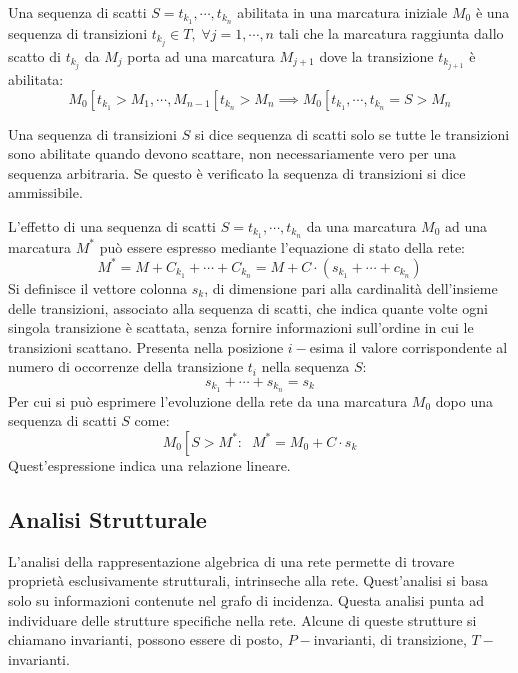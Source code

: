 \documentclass{article}
\numberwithin{equation}{subsection}
\begin{document}
Una sequenza di scatti $S=t_{k_1},\cdots,t_{k_n}$ abilitata in una marcatura iniziale $M_0$ è una sequenza di transizioni $t_{k_j}\in T,\;\forall j=1,\cdots,n$ tali che la 
marcatura raggiunta dallo scatto di $t_{k_j}$ da $M_j$ porta ad una marcatura $M_{j+1}$ dove la transizione $t_{k_{j+1}}$ è abilitata:
\begin{equation*}
    M_0\left[\right.t_{k_1}>M_1,\cdots,M_{n-1}\left[\right.t_{k_n}>M_n\implies M_0\left[\right.t_{k_1},\cdots,t_{k_n}=S>M_n
\end{equation*}

Una sequenza di transizioni $S$ si dice sequenza di scatti solo se tutte le transizioni sono abilitate quando devono scattare, non necessariamente vero per una sequenza 
arbitraria. Se questo è verificato la sequenza di transizioni si dice ammissibile. 

L'effetto di una sequenza di scatti $S=t_{k_1},\cdots,t_{k_n}$ da una marcatura $M_0$ ad una marcatura $M^*$ può essere espresso mediante l'equazione di stato della rete:
\begin{equation*}
    M^*=M+C_{k_1}+\cdots+C_{k_n}=M+C\cdot(s_{k_1}+\cdots+c_{k_n})
\end{equation*}
Si definisce il vettore colonna $s_k$, di dimensione pari alla cardinalità dell'insieme delle transizioni, associato alla sequenza di scatti, che indica quante volte ogni 
singola transizione è scattata, senza fornire informazioni sull'ordine in cui le transizioni scattano. Presenta nella posizione $i-$esima il valore corrispondente al numero 
di occorrenze della transizione $t_i$ nella sequenza $S$:
\begin{equation*}
    s_{k_1}+\cdots+s_{k_n}=s_k
\end{equation*}
Per cui si può esprimere l'evoluzione della rete da una marcatura $M_0$ dopo una sequenza di scatti $S$ come:
\begin{equation*}
    M_0\left[\right.S>M^*:\;\;M^*=M_0+C\cdot s_k
\end{equation*}
Quest'espressione indica una relazione lineare. 

\subsection{Analisi Strutturale}

L'analisi della rappresentazione algebrica di una rete permette di trovare proprietà esclusivamente strutturali, intrinseche alla rete. Quest'analisi si basa solo su 
informazioni contenute nel grafo di incidenza. Questa analisi punta ad individuare delle strutture specifiche nella rete. Alcune di queste strutture si chiamano invarianti, 
possono essere di posto, $P-$invarianti, di transizione, $T-$invarianti. 
\end{document}
